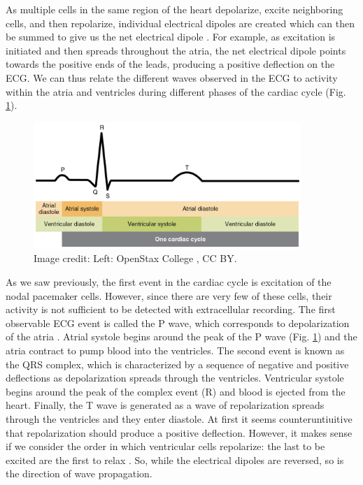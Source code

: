 \documentclass[12pt]{article}
\begin{document}
As multiple cells in the same region of the heart depolarize, excite neighboring cells, and then repolarize, individual electrical dipoles are created which can then be summed to give us the net electrical dipole \citep{mohrman2006cardiovascular}. For example, as excitation is initiated and then spreads throughout the atria, the net electrical dipole points towards the positive ends of the leads, producing a positive deflection on the ECG. We can thus relate the different waves observed in the ECG to activity within the atria and ventricles during different phases of the cardiac cycle (Fig. \ref{fig:ecg}). 

\begin{figure}[h!]
\centering
\includegraphics[width=0.9\textwidth]{figures/ECGcycle.jpg}
\caption{Image credit: Left: OpenStax College \citep{openStaxCycle}, CC BY.}
\label{fig:ecg}
\end{figure}%

As we saw previously, the first event in the cardiac cycle is excitation of the nodal pacemaker cells. However, since there are very few of these cells, their activity is not sufficient to be detected with extracellular recording. The first observable ECG event is called the P wave, which corresponds to depolarization of the atria \citep{CVphys,mohrman2006cardiovascular,openStaxElectrical}. Atrial systole begins around the peak of the P wave (Fig. \ref{fig:ecg}) and the atria contract to pump blood into the ventricles. The second event is known as the QRS complex, which is characterized by a sequence of negative and positive deflections as depolarization spreads through the ventricles. Ventricular systole begins around the peak of the complex event (R) and blood is ejected from the heart. Finally, the T wave is generated as a wave of repolarization spreads through the ventricles and they enter diastole. At first it seems counteruntiuitive that repolarization should produce a positive deflection. However, it makes sense if we consider the order in which ventricular cells repolarize: the last to be excited are the first to relax \citep{CVphys,mohrman2006cardiovascular}. So, while the electrical dipoles are reversed, so is the direction of wave propagation. 
\end{document}
